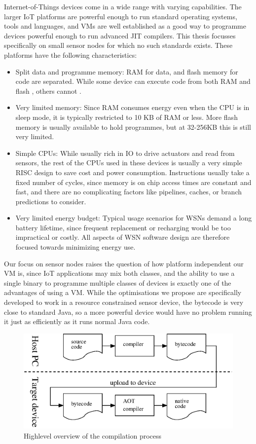 Internet-of-Things devices come in a wide range with varying capabilities. The larger IoT platforms are powerful enough to run standard operating systems, tools and languages, and VMs are well established as a good way to programme devices powerful enough to run advanced JIT compilers. This thesis focusses specifically on small sensor nodes for which no such standards exists. These platforms have the following characteristics:
\begin{itemize}
	\item Split data and programme memory: RAM for data, and flash memory for code are separated. While some device can execute code from both RAM and flash \cite{TexasInstrumentsIncorporated:MSP430F1611Datasheet}, others cannot \cite{Atmel:ATMEGA128Datasheet}.
	\item Very limited memory: Since RAM consumes energy even when the CPU is in sleep mode, it is typically restricted to 10 KB of RAM or less. More flash memory is usually available to hold programmes, but at 32-256KB this is still very limited.
	\item Simple CPUs: While usually rich in IO to drive actuators and read from sensors, the rest of the CPUs used in these devices is usually a very simple RISC design to save cost and power consumption. Instructions usually take a fixed number of cycles, since memory is on chip access times are constant and fast, and there are no complicating factors like pipelines, caches, or branch predictions to consider.
	\item Very limited energy budget: Typical usage scenarios for WSNs demand a long battery lifetime, since frequent replacement or recharging would be too impractical or costly. All aspects of WSN software design are therefore focused towards minimizing energy use.
\end{itemize}

Our focus on sensor nodes raises the question of how platform independent our VM is, since IoT applications may mix both classes, and the ability to use a single binary to programme multiple classes of devices is exactly one of the advantages of using a VM. While the optimisations we propose are specifically developed to work in a resource constrained sensor device, the bytecode is very close to standard Java, so a more powerful device would have no problem running it just as efficiently as it runs normal Java code.

\begin{figure}[]
  \centering
  \includegraphics[width=0.6\linewidth]{compilation-process-highlevel.eps}
  \caption{Highlevel overview of the compilation process}
  \label{fig-compilation-process-highlevel}
\end{figure}

